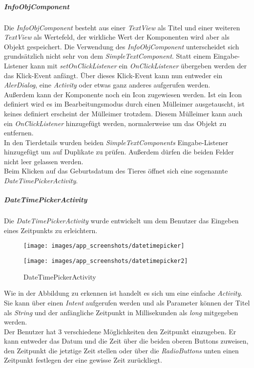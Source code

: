 \subparagraph{InfoObjComponent}
Die \textit{InfoObjComponent} besteht aus einer \textit{TextView} als Titel und einer weiteren \textit{TextView} als Wertefeld, der wirkliche Wert der Komponenten wird aber als Objekt gespeichert. Die Verwendung des \textit{InfoObjComponent} unterscheidet sich grundsätzlich nicht sehr von dem \textit{SimpleTextComponent}. Statt einem Eingabe-Listener kann mit \textit{setOnClickListener} ein \textit{OnClickListener} übergeben werden der das Klick-Event anfängt. Über dieses Klick-Event kann nun entweder ein \textit{AlerDialog}, eine \textit{Activity} oder etwas ganz anderes aufgerufen werden. \\
Außerdem kann der Komponente noch ein Icon zugewiesen werden. Ist ein Icon definiert wird es im Bearbeitungsmodus durch einen Mülleimer ausgetauscht, ist keines definiert erscheint der Mülleimer trotzdem. Diesem Mülleimer kann auch ein \textit{OnClickListener} hinzugefügt werden, normalerweise um das Objekt zu entfernen. \\ [1em]
In den Tierdetails wurden beiden \textit{SimpleTextComponents} Eingabe-Listener hinzugefügt um auf Duplikate zu prüfen. Außerdem dürfen die beiden Felder nicht leer gelassen werden. \\ 
Beim Klicken auf das Geburtsdatum des Tieres öffnet sich eine sogenannte \textit{DateTimePickerActivity}.
\subparagraph{DateTimePickerActivity}
Die \textit{DateTimePickerActivity} wurde entwickelt um dem Benutzer das Eingeben eines Zeitpunkts zu erleichtern. 
\begin{figure}[H]
  \centering
  \begin{minipage}[t]{7 cm}
  	\texttt{[image: images/app\_screenshots/datetimepicker]} 
  \end{minipage}
  \hspace{0.5cm}
  \begin{minipage}[t]{7 cm}
	\texttt{[image: images/app\_screenshots/datetimepicker2]}  
  \end{minipage}
  \caption{DateTimePickerActivity}
\end{figure}
Wie in der Abbildung zu erkennen ist handelt es sich um eine einfache \textit{Activity}. Sie kann über einen \textit{Intent} aufgerufen werden und als Parameter können der Titel als \textit{String} und der anfängliche Zeitpunkt in Millisekunden als \textit{long} mitgegeben werden.\\
Der Benutzer hat 3 verschiedene Möglichkeiten den Zeitpunkt einzugeben. Er kann entweder das Datum und die Zeit über die beiden oberen Buttons zuweisen, den Zeitpunkt die jetztige Zeit stellen oder über die \textit{RadioButtons} unten einen Zeitpunkt festlegen der eine gewisse Zeit zurückliegt.\\
